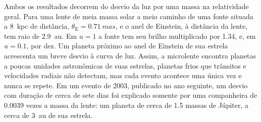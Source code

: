 Ambos os resultados decorrem do desvio da luz por uma massa na
relatividade geral. Para uma lente de meia massa solar a meio caminho de uma fonte
situada a \qty{8}{kpc} de distância, $\theta_\mathrm E = \qty{0.71}{mas}$, e o anel de
Einstein, à distância da lente, tem raio de \qty{2.9}{au}. Em
$u = 1$ a fonte tem seu brilho multiplicado por 1.34, e, em $u = 0.1$, por dez. Um
planeta próximo ao anel de Einstein de sua estrela acrescenta um breve desvio à
curva de luz. Assim, a microlente encontra planetas a poucas unidades astronômicas
de suas estrelas, planetas frios que trânsitos e velocidades radiais não detectam,
mas cada evento acontece uma única vez e nunca se repete. Em um evento de 2003,
publicado no ano seguinte, um desvio com duração de cerca de sete dias foi
explicado somente por uma companheira de $\num{0.0039}$ vezes a massa da
lente: um planeta de cerca de 1.5 massas de Júpiter, a cerca de \qty{3}{au} de sua
estrela.

